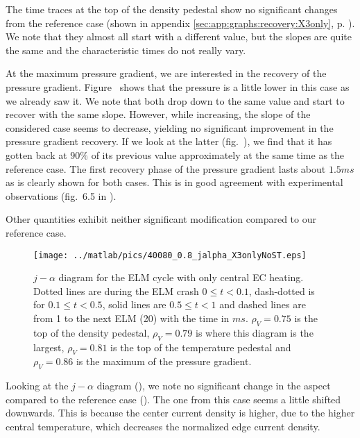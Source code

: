 The time traces at the top of the density pedestal show no significant changes from the reference case (shown in appendix \ref{sec:app:graphs:recovery:X3only}, p. \pageref{sec:app:graphs:recovery:X3only}). We note that they almost all start with a different value, but the slopes are quite the same and the characteristic times do not really vary.

At the maximum pressure gradient, we are interested in the recovery of the pressure gradient. Figure~ shows that the pressure is a little lower in this case as we already saw it. We note that both drop down to the same value and start to recover with the same slope. However, while increasing, the slope of the considered case seems to decrease, yielding no significant improvement in the pressure gradient recovery. If we look at the latter (fig.~), we find that it has gotten back at $90\%$ of its previous value approximately at the same time as the reference case. The first recovery phase of the pressure gradient lasts about $1.5ms$ as is clearly shown for both cases. This is in good agreement with experimental observations (fig.~6.5 in \cite{andreas2010}).

Other quantities exhibit neither significant modification compared to our reference case.

\begin{figure}[!t]
\begin{center}
\texttt{[image: ../matlab/pics/40080\_0.8\_jalpha\_X3onlyNoST.eps]}
\vspace{-0.5cm}
\end{center}
\caption{\footnotesize $j - \alpha$ diagram for the ELM cycle with only central EC heating. Dotted lines are during the ELM crash $0 \le t <0.1$, dash-dotted is for $0.1 \le t < 0.5$, solid lines are $0.5 \le t < 1$ and dashed lines are from 1 to the next ELM (20) with the time in $ms$. $\rho_V = 0.75$ is the top of the density pedestal, $\rho_V = 0.79$ is where this diagram is the largest, $\rho_V = 0.81$ is the top of the temperature pedestal and $\rho_V = 0.86$ is the maximum of the pressure gradient.\label{fig:results:ELM:X3only:jalpha}}
\vspace{-0.5cm}
\end{figure}
Looking at the $j - \alpha$ diagram (), we note no significant change in the aspect compared to the reference case (). The one from this case seems a little shifted downwards. This is because the center current density is higher, due to the higher central temperature, which decreases the normalized edge current density.
